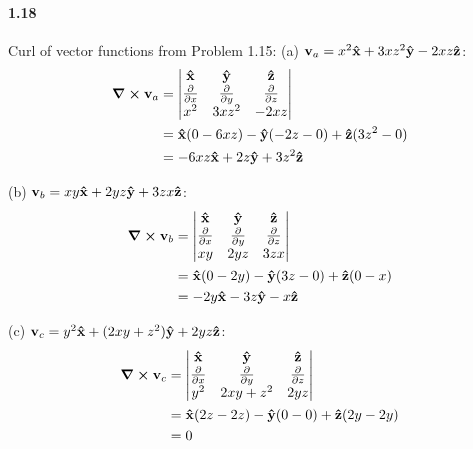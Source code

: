 \documentclass[../main.tex]{subfiles}
\begin{document}
\newpage
\paragraph*{1.18}
Curl of vector functions from Problem 1.15:
(a) $\vb{v}_a = x^2\vu{x} + 3xz^2\vu{y} - 2xz\vu{z}$:
\begin{align*}
    \curl{\vb{v}_a} &= \mqty|
        \vu{x} & \vu{y} & \vu{z} \\
        \pdv{x} & \pdv{y} & \pdv{z} \\
        x^2 & 3xz^2 & -2xz
    | \\
    &= \vu{x} (0 - 6xz) - \vu{y} (-2z - 0) + \vu{z} (3z^2 - 0) \\
    &= -6xz\vu{x} + 2z\vu{y} + 3z^2\vu{z}
\end{align*}

(b) $\vb{v}_b = xy\vu{x} + 2yz\vu{y} + 3zx\vu{z}$:
\begin{align*}
    \curl{\vb{v}_b} &= \begin{vmatrix}
        \vu{x} & \vu{y} & \vu{z} \\
        \pdv{x} & \pdv{y} & \pdv{z} \\
        xy & 2yz & 3zx
    \end{vmatrix} \\
    &= \vu{x} (0 - 2y) - \vu{y} (3z - 0) + \vu{z} (0 - x) \\
    &= -2y\vu{x} - 3z\vu{y} - x\vu{z}
\end{align*}

(c) $\vb{v}_c = y^2\vu{x} + (2xy + z^2)\vu{y} + 2yz\vu{z}$:
\begin{align*}
    \curl{\vb{v}_c} &= \begin{vmatrix}
        \vu{x} & \vu{y} & \vu{z} \\
        \pdv{x} & \pdv{y} & \pdv{z} \\
        y^2 & 2xy + z^2 & 2yz
    \end{vmatrix} \\
    &= \vu{x} (2z - 2z) - \vu{y} (0 - 0) + \vu{z} (2y - 2y) \\
    &= 0
\end{align*}

\newpage
\end{document}
